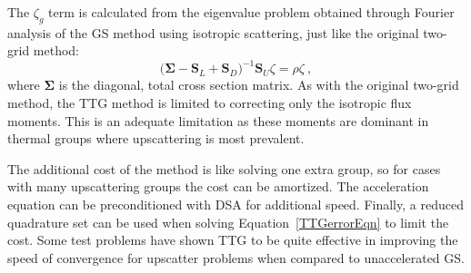 \documentclass[12pt]{article}
\newcommand{\ve}[1]{\ensuremath{\mathbf{#1}}}
\begin{document}
The $\zeta_g$ term is calculated from the eigenvalue problem obtained through Fourier analysis of the GS method using isotropic scattering, just like the original two-grid method:
%
\begin{equation}
  \bigl(\ve{\Sigma} - \ve{S}_L + \ve{S}_D\bigr)^{-1} \ve{S}_U\zeta = \rho\zeta \:,
\end{equation}
where $\ve{\Sigma}$ is the diagonal, total cross section matrix. As with the original two-grid method, the TTG method is limited to correcting only the isotropic flux moments. This is an adequate limitation as these moments are dominant in thermal groups where upscattering is most prevalent.%

The additional cost of the method is like solving one extra group, so for cases with many upscattering groups the cost can be amortized. The acceleration equation can be preconditioned with DSA for additional speed. Finally, a reduced quadrature set can be used when solving Equation~\eqref{TTGerrorEqn} to limit the cost. Some test problems have shown TTG to be quite effective in improving the speed of convergence for upscatter problems when compared to unaccelerated GS.%
\end{document}
